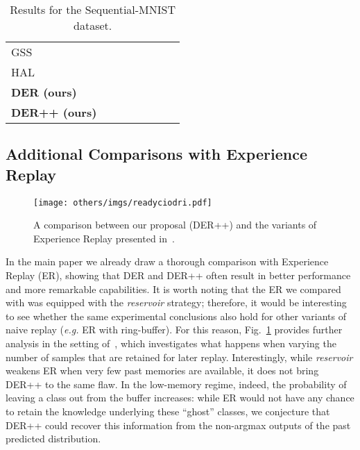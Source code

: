 \documentclass{article}
\newcommand{\quotationmarks}[1]{``#1''}
\begin{document}
\begin{table}[H]
{\begin{tabular}{lccccccc}
GSS                     & \tiny{} & \tiny{} & \tiny{} &      & \tiny{} & \tiny{} & \tiny{} \\
HAL                     & \tiny{} & \tiny{} & \tiny{} &      & \tiny{} & \tiny{} & \tiny{} \\
\textbf{DER (ours)}     & \tiny{} & \tiny{} & \tiny{} &      & \tiny{} & \tiny{} & \tiny{} \\
\textbf{DER++ (ours)}   & \tiny{} & \tiny{} & \tiny{} &      & \tiny{} & \tiny{} & \tiny{} \\
\bottomrule
\end{tabular}
}
\vspace{0.5em}
\caption{Results for the Sequential-MNIST dataset.}
\end{table}


%
 
\subsection{Additional Comparisons with Experience Replay}
\label{subsec:chaudhry_mnist}

\begin{figure}[H]
\centering
\texttt{[image: others/imgs/readyciodri.pdf]}
\caption{A comparison between our proposal (DER++) and the variants of Experience Replay presented in~\cite{chaudhry2019tiny}.}
\label{fig:ciodri}
\end{figure}

In the main paper we already draw a thorough comparison with Experience Replay (ER), showing that DER and DER++ often result in better performance and more remarkable capabilities. It is worth noting that the ER we compared with was equipped with the \textit{reservoir} strategy; therefore, it would be interesting to see whether the same experimental conclusions also hold for other variants of naive replay (\textit{e.g.} ER with ring-buffer). For this reason, Fig.~\ref{fig:ciodri} provides further analysis in the setting of~\cite{chaudhry2019tiny}, which investigates what happens when varying the number of samples that are retained for later replay. Interestingly, while \textit{reservoir} weakens ER when very few past memories are available, it does not bring DER++ to the same flaw. In the low-memory regime, indeed, the probability of leaving a class out from the buffer increases: while ER would not have any chance to retain the knowledge underlying these \quotationmarks{ghost} classes, we conjecture that DER++ could recover this information from the non-argmax outputs of the past predicted distribution.
\end{document}
